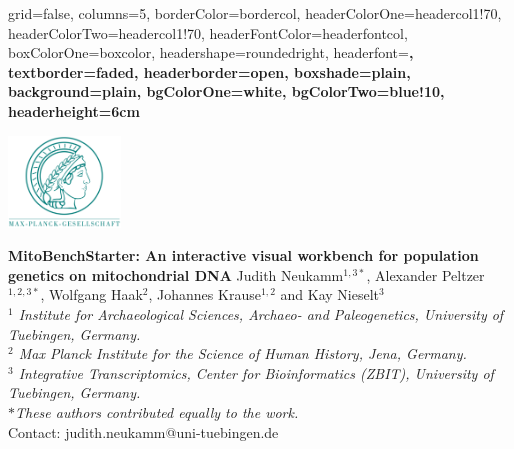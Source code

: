 \documentclass[a0paper,portrait]{baposter}
\begin{document}


\begin{poster}{
	grid=false,
	columns=5,
	borderColor=bordercol,
	headerColorOne=headercol1!70,%
	headerColorTwo=headercol1!70,%
	headerFontColor=headerfontcol,
	boxColorOne=boxcolor,
	headershape=roundedright,
	headerfont=\large\sf\bf,
	textborder=faded,%
	headerborder=open,
  	boxshade=plain,
	background=plain,%
	bgColorOne=white,
	bgColorTwo=blue!10,
	headerheight=6cm
}
{

	\includegraphics[width=3cm]{figures/Max-Planck-Gesellschaft.png}

}
{\Large\bf
	MitoBenchStarter: An interactive visual workbench for population genetics on mitochondrial DNA
}
{
	\vspace{1em} Judith Neukamm$^{1,3*}$, Alexander Peltzer$^{1,2,3*}$, Wolfgang Haak$^{2}$, Johannes Krause$^{1,2}$ and Kay Nieselt$^{3}$\\
	{\footnotesize \textit{$^1$ Institute for Archaeological Sciences, Archaeo- and Paleogenetics, University of Tuebingen, Germany.\\
	$^2$ Max Planck Institute for the Science of Human History, Jena, Germany.\\
	$^3$ Integrative Transcriptomics, Center for Bioinformatics (ZBIT), University of Tuebingen, Germany.\\
	$*$These authors contributed equally to the work.}\\
	\vspace{1em}
	Contact: judith.neukamm@uni-tuebingen.de
	}
}
{

}
\end{poster}
\end{document}

